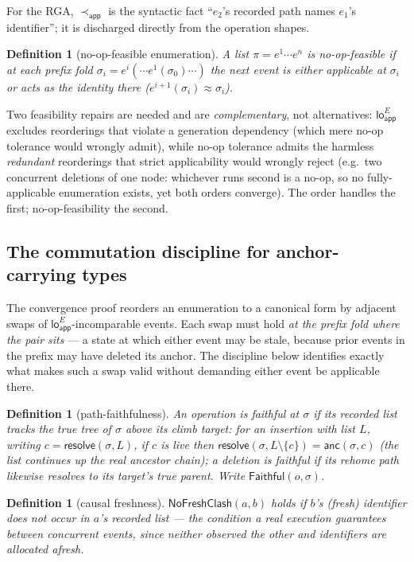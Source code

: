 \documentclass[11pt]{article}
\newtheorem{definition}[theorem]{Definition}
\newcommand{\Sinit}{\sigma_0}
\newcommand{\app}{\mathsf{app}}
\newcommand{\loA}[1]{\mathsf{lo}_{\!\app}^{#1}}
\newcommand{\eqobs}{\approx}
\newcommand{\resolve}{\mathsf{resolve}}
\newcommand{\anc}{\mathsf{anc}}
\newcommand{\faith}{\mathsf{Faithful}}
\newcommand{\nfc}{\mathsf{NoFreshClash}}
\begin{document}
For the RGA, $\prec_{\app}$ is the syntactic fact ``$e_2$'s recorded path names
$e_1$'s identifier''; it is discharged directly from the operation shapes.

\begin{definition}[no-op-feasible enumeration]
\label{def:noop}
A list $\pi=e^1\cdots e^n$ is \emph{no-op-feasible} if at each prefix fold
$\sigma_i = e^i(\cdots e^1(\Sinit)\cdots)$ the next event is either applicable at
$\sigma_i$ or acts as the identity there ($e^{i+1}(\sigma_i)\eqobs \sigma_i$).
\end{definition}

Two feasibility repairs are needed and are \emph{complementary}, not
alternatives: $\loA{E}$ excludes reorderings that violate a generation dependency
(which mere no-op tolerance would wrongly admit), while no-op tolerance admits the
harmless \emph{redundant} reorderings that strict applicability would wrongly
reject (e.g.\ two concurrent deletions of one node: whichever runs second is a
no-op, so no fully-applicable enumeration exists, yet both orders converge). The
order handles the first; no-op-feasibility the second.

\subsection{The commutation discipline for anchor-carrying types}

The convergence proof reorders an enumeration to a canonical form by adjacent
swaps of $\loA{E}$-incomparable events. Each swap must hold \emph{at the prefix
fold where the pair sits} --- a state at which either event may be stale, because
prior events in the prefix may have deleted its anchor. The discipline below
identifies exactly what makes such a swap valid without demanding either event be
applicable there.

\begin{definition}[path-faithfulness]
\label{def:faith}
An operation is \emph{faithful} at $\sigma$ if its recorded list tracks the true
tree of $\sigma$ above its climb target: for an insertion with list $L$, writing
$c=\resolve(\sigma,L)$, if $c$ is live then
$\resolve(\sigma,L\!\setminus\!\{c\}) = \anc(\sigma,c)$ (the list continues up the
real ancestor chain); a deletion is faithful if its rehome path likewise resolves
to its target's true parent. Write $\faith(o,\sigma)$.
\end{definition}

\begin{definition}[causal freshness]
\label{def:nfc}
$\nfc(a,b)$ holds if $b$'s (fresh) identifier does not occur in $a$'s recorded
list --- the condition a real execution guarantees between concurrent events,
since neither observed the other and identifiers are allocated afresh.
\end{definition}
\end{document}

